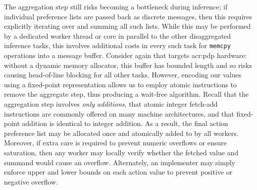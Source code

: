 The aggregation step still risks becoming a bottleneck during inference; if individual preference lists are passed back as discrete messages, then this requires explicitly iterating over and summing all such lists.
While this may be performed by a dedicated worker thread or core in parallel to the other disaggregated inference tasks, this involves additional costs in every such task for \texttt{memcpy} operations into a message buffer.
Consider again that \approachshort{} targets \gls{acr:pdp} hardware: without a dynamic memory allocator, this buffer has bounded length and so risks causing head-of-line blocking for all other tasks.
However, encoding our values using a fixed-point representation allows us to employ atomic instructions to remove the aggregate step, thus producing a wait-free algorithm.
Recall that the aggregation step involves \emph{only additions}, that atomic integer fetch-add instructions are commonly offered on many machine architectures, and that fixed-point addition is identical to integer addition.
As a result, the final action preference list may be allocated once and atomically added to by all workers.
Moreover, if extra care is required to prevent numeric overflows or ensure saturation, then any worker may locally verify whether the fetched value and summand would cause an overflow.
Alternately, an implementer may simply enforce upper and lower bounds on each action value to prevent positive or negative overflow.

